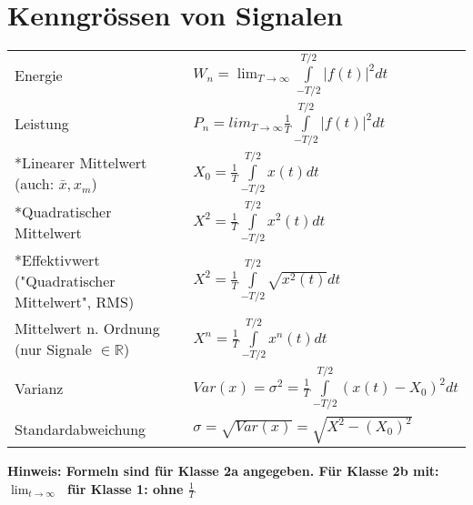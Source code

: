 \section{Kenngrössen von Signalen}
\begin{tabular}{p{6cm}p{12cm}}
  Energie                                                            &
  $W_n = \lim_{T \to \infty}  \int \limits _{-T/2} ^{T/2} |f(t)|^2 dt$            \\
  \rowcolor{TabularBackgroundColor}
  Leistung                                                           &
  $P_n = lim_{T \to \infty} \frac{1}{T} \int \limits _{-T/2} ^{T/2} |f(t)|^2 dt$  \\
  *Linearer Mittelwert
  \newline \tiny(auch: $ \bar{x}, x_m$)                              &
  $X_0 = \frac{1}{T} \int \limits _{-T/2}^{T/2} x(t) dt $                         \\
  \rowcolor{TabularBackgroundColor}
  *Quadratischer Mittelwert                                          &
  $X^2 = \frac{1}{T} \int \limits _{-T/2}^{T/2} x^2(t) dt$                        \\
  *Effektivwert \newline \tiny{("Quadratischer Mittelwert", RMS)}    &
  $X^2 = \frac{1}{T} \int \limits _{-T/2}^{T/2} \sqrt{x^2(t)} dt $                \\
  \rowcolor{TabularBackgroundColor}
  Mittelwert n. Ordnung \newline \tiny(nur Signale $\in \mathbb{R}$) &
  $X^n = \frac{1}{T} \int \limits _{-T/2} ^{T/2} x^n(t)dt$                        \\
  Varianz                                                            &
  $Var(x) = \sigma^2 = \frac{1}{T} \int \limits _{-T/2} ^{T/2} (x(t) - X_0)^2 dt$ \\
  \rowcolor{TabularBackgroundColor}
  Standardabweichung                                                 &
  $\sigma = \sqrt{Var(x)} = \sqrt{X^2 - (X_0)^2}$                                 \\
\end{tabular}
\textbf{\tiny *Hinweis: Formeln sind für Klasse 2a angegeben. \newline
  Für Klasse 2b mit: $\lim_{t \to \infty}\;$ für Klasse 1: ohne $\frac{1}{T}$ }

